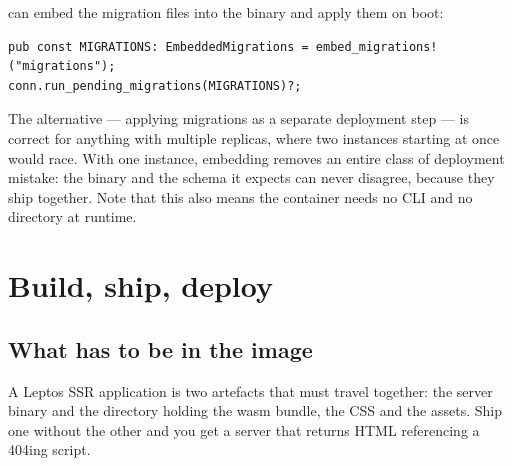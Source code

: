  can embed the migration files into the binary and apply them on boot:

\begin{lstlisting}[style=rs]
pub const MIGRATIONS: EmbeddedMigrations = embed_migrations!("migrations");
conn.run_pending_migrations(MIGRATIONS)?;
\end{lstlisting}

\begin{pattern}
The alternative --- applying migrations as a separate deployment step --- is correct for anything
with multiple replicas, where two instances starting at once would race. With one instance,
embedding removes an entire class of deployment mistake: the binary and the schema it expects can
never disagree, because they ship together. Note that this also means the container needs no
 CLI and no  directory at runtime.
\end{pattern}

\chapter{Build, ship, deploy}
\label{ch:deploy}

\section{What has to be in the image}

A Leptos SSR application is two artefacts that must travel together: the server binary and the
 directory holding the wasm bundle, the CSS and the assets. Ship one without the other
and you get a server that returns HTML referencing a 404ing script.

